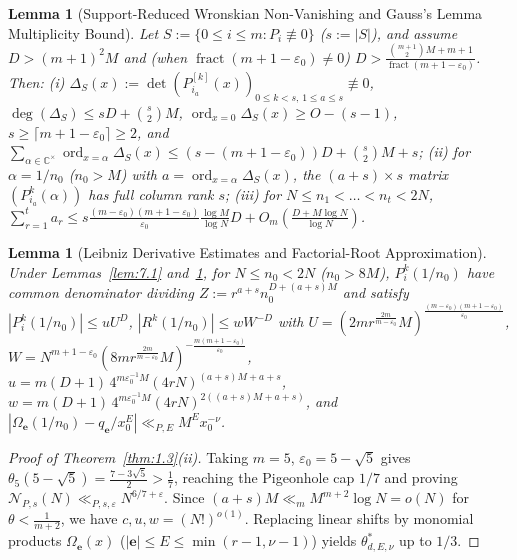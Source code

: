 \documentclass[11pt,reqno]{amsart}
\newtheorem{lemma}[theorem]{Lemma}
\theoremstyle{remark}
\newcommand{\C}{\mathbb{C}}
\newcommand{\ord}{\operatorname{ord}}
\begin{document}
\begin{lemma}[Support-Reduced Wronskian Non-Vanishing and Gauss's Lemma Multiplicity Bound]\label{lem:7.3}
Let $S := \{0 \le i \le m : P_i \not\equiv 0\}$ ($s := |S|$), and assume $D > (m+1)^2 M$ and (when $\operatorname{fract}(m+1-\varepsilon_0) \ne 0$) $D > \frac{\binom{m+1}{2}M + m + 1}{\operatorname{fract}(m+1-\varepsilon_0)}$. Then:
(i) $\Delta_S(x) := \det(P_{i_a}^{[k]}(x))_{0 \le k < s,\, 1 \le a \le s} \not\equiv 0$, $\deg(\Delta_S) \le sD + \binom{s}{2}M$, $\ord_{x=0}\Delta_S(x) \ge O - (s - 1)$, $s \ge \lceil m + 1 - \varepsilon_0 \rceil \ge 2$, and $\sum_{\alpha \in \C^\times} \ord_{x=\alpha}\Delta_S(x) \le (s - (m+1-\varepsilon_0))D + \binom{s}{2}M + s$;
(ii) for $\alpha = 1/n_0$ ($n_0 > M$) with $a = \ord_{x=\alpha}\Delta_S(x)$, the $(a+s) \times s$ matrix $(P_{i_a}^k(\alpha))$ has full column rank $s$;
(iii) for $N \le n_1 < \dots < n_t < 2N$, $\sum_{r=1}^t a_r \le s\frac{(m-\varepsilon_0)(m+1-\varepsilon_0)}{\varepsilon_0}\frac{\log M}{\log N} D + O_m(\frac{D + M\log N}{\log N})$.
\end{lemma}

\begin{lemma}[Leibniz Derivative Estimates and Factorial-Root Approximation]\label{lem:7.4}
Under Lemmas~\ref{lem:7.1} and~\ref{lem:7.3}, for $N \le n_0 < 2N$ ($n_0 > 8M$), $P_i^k(1/n_0)$ have common denominator dividing $Z := r^{a+s} n_0^{D + (a+s)M}$ and satisfy $|P_i^k(1/n_0)| \le u U^D$, $|R^k(1/n_0)| \le w W^{-D}$ with $U = (2 m r^{\frac{2m}{m-\varepsilon_0}} M)^{\frac{(m-\varepsilon_0)(m+1-\varepsilon_0)}{\varepsilon_0}}$, $W = N^{m+1-\varepsilon_0}(8 m r^{\frac{2m}{m-\varepsilon_0}} M)^{-\frac{m(m+1-\varepsilon_0)}{\varepsilon_0}}$, $u = m(D+1)\, 4^{m\varepsilon_0^{-1}M}(4rN)^{(a+s)M + a + s}$, $w = m(D+1)\, 4^{m\varepsilon_0^{-1}M}(4rN)^{2((a+s)M + a + s)}$, and $|\Omega_{\mathbf{e}}(1/n_0) - q_{\mathbf{e}}/x_0^E| \ll_{P,E} M^E x_0^{-\nu}$.
\end{lemma}

\begin{proof}[Proof of Theorem~\ref{thm:1.3}(ii)]
Taking $m = 5$, $\varepsilon_0 = 5 - \sqrt{5}$ gives $\theta_5(5 - \sqrt{5}) = \frac{7 - 3\sqrt{5}}{2} > \frac{1}{7}$, reaching the Pigeonhole cap $1/7$ and proving $\mathcal{N}_{P,s}(N) \ll_{P,s,\varepsilon} N^{6/7+\varepsilon}$. Since $(a+s)M \ll_m M^{m+2}\log N = o(N)$ for $\theta < \frac{1}{m+2}$, we have $c, u, w = (N!)^{o(1)}$. Replacing linear shifts by monomial products $\Omega_{\mathbf{e}}(x)$ ($|\mathbf{e}| \le E \le \min(r-1, \nu-1)$) yields $\theta^*_{d,E,\nu}$ up to $1/3$.
\end{proof}
\end{document}
